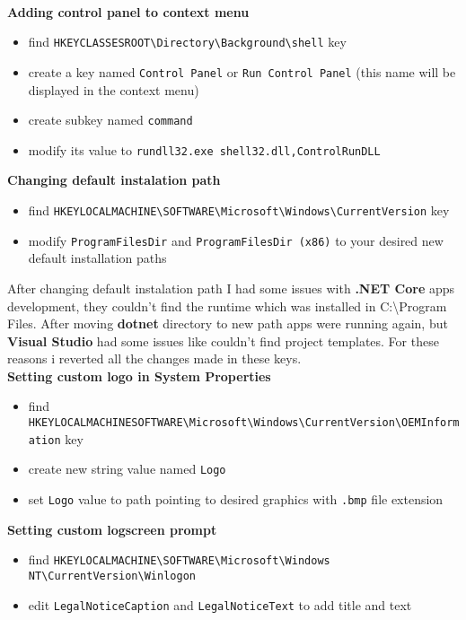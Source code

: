 \documentclass[11pt,a4paper]{article}
\def\bs{\textbackslash}
\def\us{\textunderscore}
\begin{document}
\\

\textbf{Adding control panel to context menu}
\begin{itemize}
\item find \texttt{HKEY{\us}CLASSES{\us}ROOT{\bs}Directory{\bs}Background{\bs}shell} key
\item create a key named \texttt{Control Panel} or \texttt{Run Control Panel} (this name will be displayed in the context menu)
\item create subkey named \texttt{command}
\item modify its value to \texttt{rundll32.exe shell32.dll,Control{\us}RunDLL}
\end{itemize}

\textbf{Changing default instalation path}

\begin{itemize}
\item find \texttt{HKEY{\us}LOCAL{\us}MACHINE{\bs}SOFTWARE{\bs}Microsoft{\bs}Windows{\bs}CurrentVersion} key
\item modify \texttt{ProgramFilesDir} and \texttt{ProgramFilesDir (x86)} to your desired new default installation paths
\end{itemize}

 After changing default instalation path I had some issues with \textbf{.NET Core} apps development, they couldn't find the runtime which was installed in C:{\bs}Program Files. After moving \textbf{dotnet} directory to new path apps were running again, but \textbf{Visual Studio} had some issues like couldn't find project templates. For these reasons i reverted all the changes made in these keys.\\

\textbf{Setting custom logo in System Properties }
\begin{itemize}
\item find \texttt{HKEY{\us}LOCAL{\us}MACHINE{\us}SOFTWARE{\bs}Microsoft{\bs}Windows{\bs}CurrentVersion{\bs}OEMInformation} key
\item create new string value named \texttt{Logo}
\item set \texttt{Logo} value to path pointing to desired graphics with \texttt{.bmp} file extension
\end{itemize}

\textbf{Setting custom logscreen prompt}
\begin{itemize}
\item find \texttt{HKEY{\us}LOCAL{\us}MACHINE{\bs}SOFTWARE{\bs}Microsoft{\bs}Windows NT{\bs}CurrentVersion{\bs}Winlogon}
\item edit \texttt{LegalNoticeCaption} and \texttt{LegalNoticeText} to add title and text
\end{itemize}
\end{document}
